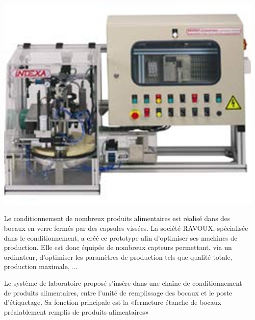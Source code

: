 \documentclass[10pt,oneside]{article}
\begin{document}
\begin{minipage}[c]{.4\linewidth}
\begin{center}
 \includegraphics[width=\textwidth]{png/capsuleuse}
\end{center}

\end{minipage} \hfill
\begin{minipage}[c]{.55\linewidth}
Le conditionnement de nombreux produits alimentaires est réalisé dans des bocaux en verre fermés par des capsules vissées. La société RAVOUX, spécialisée dans le conditionnement, a créé ce prototype afin d'optimiser ses machines de production. Elle est donc équipée de nombreux capteurs permettant, via un ordinateur, d'optimiser les paramètres de production tels que qualité totale, production maximale, ...

Le système de laboratoire proposé s'insère dans une chaîne de conditionnement de produits alimentaires, entre l'unité de remplissage des bocaux et le poste d'étiquetage. Sa fonction principale est la «fermeture étanche de bocaux préalablement remplis de produits alimentaires»
\end{minipage}
\end{document}

